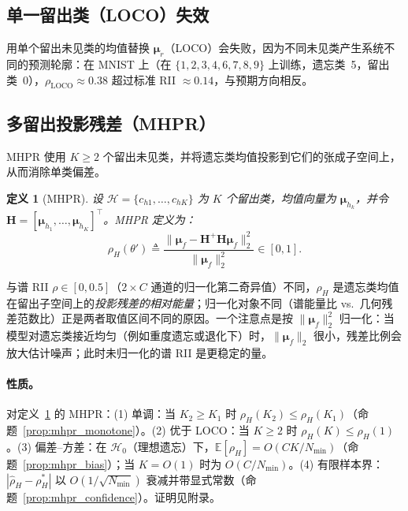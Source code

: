 \documentclass[11pt,a4paper]{article}
\newtheorem{definition}[theorem]{定义}
\newcommand{\coloneqq}{\triangleq}
\begin{document}
\subsection{单一留出类（LOCO）失效}

用单个留出未见类的均值替换 $\boldsymbol{\mu}_r$（LOCO）会失败，因为不同未见类产生系统不同的预测轮廓：在 MNIST 上（在 $\{1,2,3,4,6,7,8,9\}$ 上训练，遗忘类~5，留出类~0），$\rho_{\mathrm{LOCO}}{\approx}0.38$ 超过标准 RII ${\approx}0.14$，与预期方向相反。

\subsection{多留出投影残差（MHPR）}
\label{sec:mhpr}

MHPR 使用 $K \ge 2$ 个留出未见类，并将遗忘类均值投影到它们的张成子空间上，从而消除单类偏差。

\begin{definition}[MHPR]
\label{def:mhpr}
设 $\mathcal{H} = \{c_{h1},\dots,c_{hK}\}$ 为 $K$ 个留出类，均值向量为 $\boldsymbol{\mu}_{h_k}$，并令 $\mathbf{H} = [\boldsymbol{\mu}_{h_1},\dots,\boldsymbol{\mu}_{h_K}]^\top$。MHPR 定义为：
\begin{equation}
\rho_H(\theta') \coloneqq \frac{\|\boldsymbol{\mu}_f - \mathbf{H}^+ \mathbf{H} \boldsymbol{\mu}_f\|_2^2}{\|\boldsymbol{\mu}_f\|_2^2} \in [0,1].
\end{equation}
\end{definition}

与谱 RII $\rho\in[0,0.5]$（$2\times C$ 通道的归一化第二奇异值）不同，$\rho_H$ 是遗忘类均值在留出子空间上的\emph{投影残差的相对能量}；归一化对象不同（谱能量比 vs.\ 几何残差范数比）正是两者取值区间不同的原因。一个注意点是按 $\|\boldsymbol{\mu}_f\|_2^2$ 归一化：当模型对遗忘类接近均匀（例如重度遗忘或退化下）时，$\|\boldsymbol{\mu}_f\|_2$ 很小，残差比例会放大估计噪声；此时未归一化的谱 RII 是更稳定的量。

\paragraph{性质。}
对定义~\ref{def:mhpr} 的 MHPR：(1) 单调：当 $K_2 \ge K_1$ 时 $\rho_H(K_2) \le \rho_H(K_1)$（命题~\ref{prop:mhpr_monotone}）。(2) 优于 LOCO：当 $K\ge 2$ 时 $\rho_H(K) \le \rho_H(1)$。(3) 偏差--方差：在 $\mathcal{H}_0$（理想遗忘）下，$\mathbb{E}[\rho_H] = O(CK/N_{\min})$（命题~\ref{prop:mhpr_bias}）；当 $K=O(1)$ 时为 $O(C/N_{\min})$。(4) 有限样本界：$|\hat{\rho}_H - \rho_H^*|$ 以 $O(1/\sqrt{N_{\min}})$ 衰减并带显式常数（命题~\ref{prop:mhpr_confidence}）。证明见附录。
\end{document}
